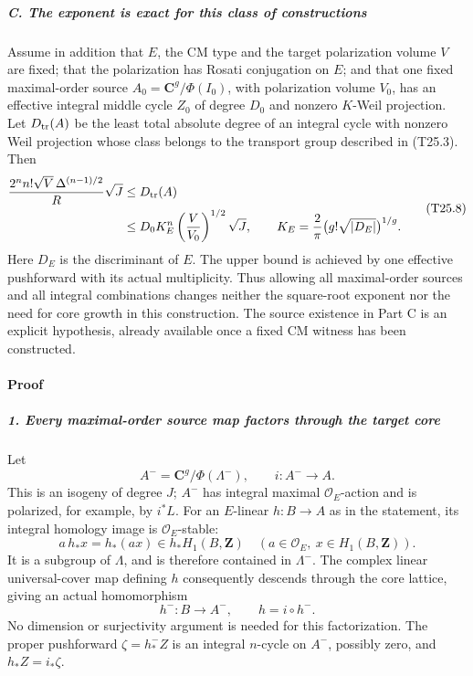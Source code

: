 \subparagraph{C. The exponent is exact for this class of constructions}\label{c.-the-exponent-is-exact-for-this-class-of-constructions}

Assume in addition that \(E\), the CM type and the target polarization volume \(V\) are fixed; that the polarization has Rosati conjugation on \(E\); and that one fixed maximal-order source \(A_0=\mathbf C^g/\Phi(I_0)\), with polarization volume \(V_0\), has an effective integral middle cycle \(Z_0\) of degree \(D_0\) and nonzero \(K\)-Weil projection. Let \(D_{\rm tr}(A)\) be the least total absolute degree of an integral cycle with nonzero Weil projection whose class belongs to the transport group described in (T25.3). Then \[
 \begin{aligned}
 \frac{2^n n!\sqrt V\,\Delta^{(n-1)/2}}{R}\sqrt J
 &\le D_{\rm tr}(A)\\
 &\le D_0 K_E^n\left(\frac V{V_0}\right)^{1/2}\sqrt J,
 \qquad
 K_E=\frac2\pi\bigl(g!\sqrt{|D_E|}\bigr)^{1/g}.
 \end{aligned}
 \tag{T25.8}
\] Here \(D_E\) is the discriminant of \(E\). The upper bound is achieved by one effective pushforward with its actual multiplicity. Thus allowing all maximal-order sources and all integral combinations changes neither the square-root exponent nor the need for core growth in this construction. The source existence in Part C is an explicit hypothesis, already available once a fixed CM witness has been constructed.

\paragraph{Proof}\label{proof-6}

\subparagraph{1. Every maximal-order source map factors through the target core}\label{every-maximal-order-source-map-factors-through-the-target-core}

Let \[
 A^-=\mathbf C^g/\Phi(\Lambda^-),\qquad
 i:A^-\longrightarrow A.
 \tag{T25.9}
\] This is an isogeny of degree \(J\); \(A^-\) has integral maximal \(\mathcal O_E\)-action and is polarized, for example, by \(i^*L\). For an \(E\)-linear \(h:B\to A\) as in the statement, its integral homology image is \(\mathcal O_E\)-stable: \[
 a\,h_*x=h_*(a x)\in h_*H_1(B,\mathbf Z)
 \quad(a\in\mathcal O_E,\ x\in H_1(B,\mathbf Z)).
 \tag{T25.10}
\] It is a subgroup of \(\Lambda\), and is therefore contained in \(\Lambda^-\). The complex linear universal-cover map defining \(h\) consequently descends through the core lattice, giving an actual homomorphism \[
 h^-:B\longrightarrow A^-,\qquad h=i\circ h^-.
 \tag{T25.11}
\] No dimension or surjectivity argument is needed for this factorization. The proper pushforward \(\zeta=h^-_*Z\) is an integral \(n\)-cycle on \(A^-\), possibly zero, and \(h_*Z=i_*\zeta\).

